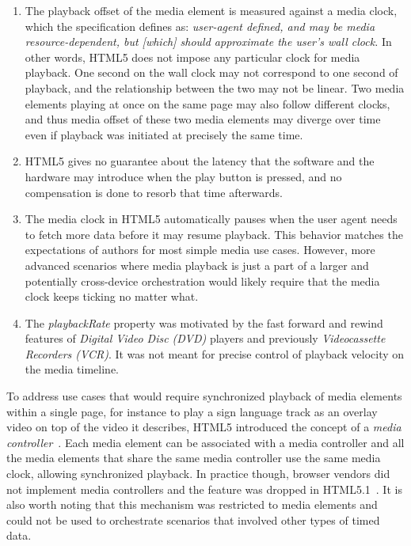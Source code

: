 \begin{enumerate}

\item{

The playback offset of the media element is measured against a media clock,
which the specification defines as: \emph{user-agent defined, and may be media
resource-dependent, but [which] should approximate the user's wall clock.} In
other words, HTML5 does not impose any particular clock for media playback.
One second on the wall clock may not correspond to one second of playback, and
the relationship between the two may not be linear. Two media elements playing
at once on the same page may also follow different clocks, and thus media
offset of these two media elements may diverge over time even if playback was
initiated at precisely the same time.

}

\item{

HTML5 gives no guarantee about the latency that the software and the hardware
may introduce when the play button is pressed, and no compensation is done to
resorb that time afterwards.

}

\item{

The media clock in HTML5 automatically pauses when the user agent needs to
fetch more data before it may resume playback. This behavior matches the
expectations of authors for most simple media use cases. However, more advanced
scenarios where media playback is just a part of a larger and potentially
cross-device orchestration would likely require that the media clock keeps
ticking no matter what.

}

\item{

The \emph{playbackRate} property was motivated by the fast forward and rewind
features of \emph{Digital Video Disc (DVD)} players and previously
\emph{Videocassette Recorders (VCR)}. It was not meant for precise control of
playback velocity on the media timeline.

}

\end{enumerate}

To address use cases that would require synchronized playback of media
elements within a single page, for instance to play a sign language track as
an overlay video on top of the video it describes, HTML5 introduced the
concept of a \emph{media controller}~\cite{mediacontroller}. Each media
element can be associated with a media controller and all the media elements
that share the same media controller use the same media clock, allowing
synchronized playback. In practice though, browser vendors did not implement
media controllers and the feature was dropped in HTML5.1~\cite{html51}. It is
also worth noting that this mechanism was restricted to media elements and
could not be used to orchestrate scenarios that involved other types of timed
data.

